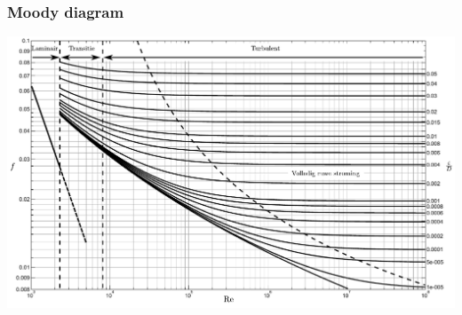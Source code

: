 \documentclass[t]{beamer}
\begin{document}
  	\begin{frame}
		\frametitle{Moody diagram}
		\center
		\includegraphics[width=\textwidth]{../fig/stroming_in_leidingen/Moody_diagram_regimes}
	\end{frame}
\end{document}
